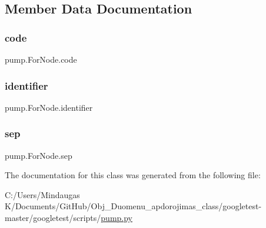 \subsection{Member Data Documentation}
\mbox{\label{classpump_1_1_for_node_afdb5f4f2a3bc772bbc6ea777dfde898e}} 
\subsubsection{\texorpdfstring{code}{code}}
{\footnotesize\ttfamily pump.\+For\+Node.\+code}

\mbox{\label{classpump_1_1_for_node_a2444199e135e43696b3a006bd0d38982}} 
\subsubsection{\texorpdfstring{identifier}{identifier}}
{\footnotesize\ttfamily pump.\+For\+Node.\+identifier}

\mbox{\label{classpump_1_1_for_node_a06b493278b3c1ad53363a2bcc3b8efb3}} 
\subsubsection{\texorpdfstring{sep}{sep}}
{\footnotesize\ttfamily pump.\+For\+Node.\+sep}



The documentation for this class was generated from the following file\+:\begin{DoxyCompactItemize}
\item 
C\+:/\+Users/\+Mindaugas K/\+Documents/\+Git\+Hub/\+Obj\+\_\+\+Duomenu\+\_\+apdorojimas\+\_\+class/googletest-\/master/googletest/scripts/\mbox{\hyperlink{googletest-master_2googletest_2scripts_2pump_8py}{pump.\+py}}\end{DoxyCompactItemize}
